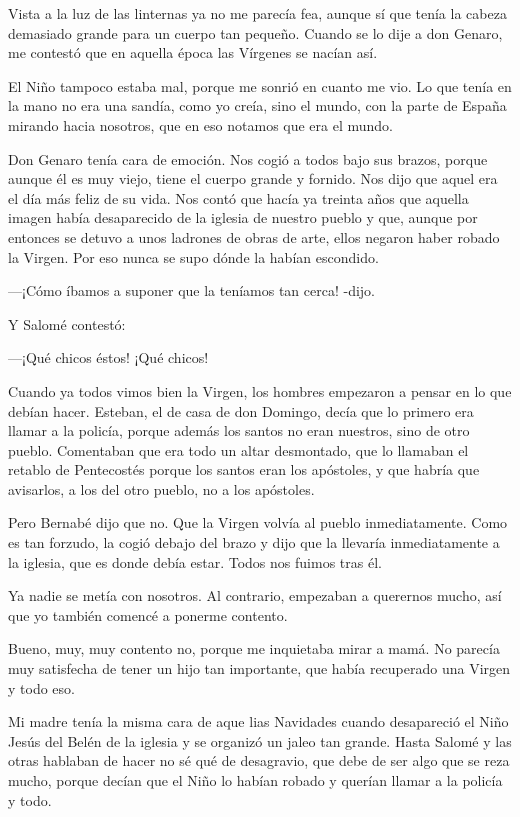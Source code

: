 \documentclass{barcodevapor3pags}
\begin{document}
Vista a la luz de las linternas ya no me parecía fea, aunque sí que
tenía la cabeza demasiado grande para un cuerpo tan pequeño. Cuando se
lo dije a don Genaro, me contestó que en aquella época las Vírgenes se
nacían así.~



El Niño tampoco estaba mal, porque me sonrió en cuanto me vio. Lo que
tenía en la mano no era una sandía, como yo creía, sino el mundo, con la
parte de España mirando hacia nosotros, que en eso notamos que era el
mundo.~

Don Genaro tenía cara de emoción. Nos cogió a todos bajo sus brazos,
porque aunque él es muy viejo, tiene el cuerpo grande y fornido. Nos
dijo que aquel era el día más feliz de su vida. Nos contó que hacía ya
treinta años que aquella imagen había desaparecido de la iglesia de
nuestro pueblo y que, aunque por entonces se detuvo a unos ladrones de
obras de arte, ellos negaron haber robado la Virgen. Por eso nunca se
supo dónde la habían escondido.~

---¡Cómo íbamos a suponer que la teníamos tan cerca! -dijo.~

Y Salomé contestó:~

---¡Qué chicos éstos! ¡Qué chicos!~

Cuando ya todos vimos bien la Virgen, los hombres empezaron a pensar en
lo que debían hacer. Esteban, el de casa de don Domingo, decía que lo
primero era llamar a la policía, porque además los santos no eran
nuestros, sino de otro pueblo. Comentaban que era todo un altar
desmontado, que lo llamaban el retablo de Pentecostés porque los santos
eran los apóstoles, y que habría que avisarlos, a los del otro pueblo,
no a los apóstoles.~

Pero Bernabé dijo que no. Que la Virgen volvía al pueblo inmediatamente.
Como es tan forzudo, la cogió debajo del brazo y dijo que la llevaría
inmediatamente a la iglesia, que es donde debía estar. Todos nos fuimos
tras él.~

Ya nadie se metía con nosotros. Al contrario, empezaban a querernos
mucho, así que yo también comencé a ponerme contento.~

Bueno, muy, muy contento no, porque me inquietaba mirar a mamá. No
parecía muy satisfecha de tener un hijo tan importante, que había
recuperado una Virgen y todo eso.~



Mi madre tenía la misma cara de aque lias Navidades cuando desapareció
el Niño Jesús del Belén de la iglesia y se organizó un jaleo tan grande.
Hasta Salomé y las otras hablaban de hacer no sé qué de desagravio, que
debe de ser algo que se reza mucho, porque decían que el Niño lo habían
robado y querían llamar a la policía y todo.~
\end{document}
